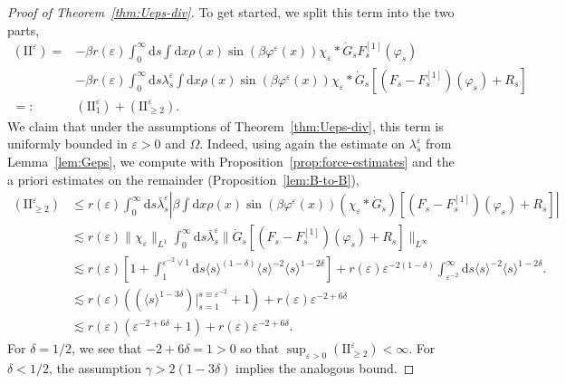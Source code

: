 \documentclass[11pt, a4paper]{scrartcl}
\numberwithin{equation}{section}
\theoremstyle{plain}
\theoremstyle{remark}
\newcommand{\Iota}{\mathrm{I}}
\newcommand{\backassign}{=:}
\newcommand{\mathd}{\mathrm{d}}
\newcommand{\tmtextbf}[1]{\text{{\bfseries{#1}}}}
\begin{document}
\begin{proof}[Proof of Theorem~\ref{thm:Ueps-div}]
  \tmtextbf{$(\Iota \Iota^{\varepsilon})$} To get started, we split this term
  into the two parts,
  \[ \begin{aligned}
       (\Iota \Iota^{\varepsilon}) =& - \beta r (\varepsilon)
       \int_0^{\infty} \mathd s \int \mathd x \rho (x) \sin (\beta
       \varphi^{\varepsilon} (x)) \chi_{\varepsilon} \ast \dot{G}_s F_s^{[1]}
       (\varphi_s)\\
       & - \beta r (\varepsilon) \int_0^{\infty} \mathd s
       \lambda_s^{\varepsilon} \int \mathd x \rho (x) \sin (\beta
       \varphi^{\varepsilon} (x)) \chi_{\varepsilon} \ast \dot{G}_s [(F_s  -
       F_s^{[1]}) (\varphi_s) + R_s]\\
       \backassign&  (\Iota \Iota^{\varepsilon}_1) + (\Iota
       \Iota_{\geqslant 2}^{\varepsilon}) .
     \end{aligned} \]
  \tmtextbf{$(\Iota \Iota^{\varepsilon}_{\geqslant 2})$} We claim that under
  the assumptions of Theorem~\ref{thm:Ueps-div}, this term is uniformly
  bounded in $\varepsilon > 0$ and $\Omega$. Indeed, using again the estimate
  on $\lambda^{\varepsilon}_s$ from Lemma~\ref{lem:Geps}, we compute with
  Proposition~\ref{prop:force-estimates} and the a priori estimates on the
  remainder (Proposition~\ref{lem:B-to-B}),
  \[ \begin{aligned}
       (\Iota \Iota_{\geqslant 2}^{\varepsilon}) &\leqslant  r (\varepsilon)
       \int_0^{\infty} \mathd s \bar{\lambda}_s^{\varepsilon} \left| \beta \int
       \mathd x \rho (x) \sin (\beta \varphi^{\varepsilon} (x))
       (\chi_{\varepsilon} \ast \dot{G}_s) [(F_s  - F_s^{[1]}) (\varphi_s) +
       R_s] \right|\\
       & \lesssim  r (\varepsilon) \| \chi_{\varepsilon} \|_{L^1}
       \int_0^{\infty} \mathd s \bar{\lambda}_s^{\varepsilon} \| \dot{G}_s [(F_s  -
       F_s^{[1]}) (\varphi_s) + R_s] \|_{L^{\infty}}\\
       & \lesssim  r (\varepsilon) \left[ 1 + \int_1^{\varepsilon^{- 2} \vee
       1} \mathd s \langle s \rangle^{(1 - \delta)} \langle s \rangle^{- 2}
       \langle s \rangle^{1 - 2 \delta} \right] + r (\varepsilon)
       \varepsilon^{- 2 (1 - \delta)} \int_{\varepsilon^{- 2}}^{\infty} \mathd
       s \langle s \rangle^{- 2} \langle s \rangle^{1 - 2 \delta} .\\
       & \lesssim  r (\varepsilon) ((\langle s \rangle^{1 - 3 \delta}) |_{s
       = 1}^{s \equiv \varepsilon^{- 2}} + 1) + r (\varepsilon) \varepsilon^{-
       2 + 6 \delta}\\
       & \lesssim  r (\varepsilon) (\varepsilon^{- 2 + 6 \delta} + 1) + r
       (\varepsilon) \varepsilon^{- 2 + 6 \delta}.
     \end{aligned} \]
  For $\delta = 1 / 2$, we see that $- 2 + 6 \delta = 1 > 0$ so that
  $\sup_{\varepsilon > 0} (\Iota \Iota^{\varepsilon}_{\geqslant 2}) < \infty$.
  For $\delta < 1 / 2$, the assumption $\gamma > 2 (1 - 3 \delta)$ implies the
  analogous bound.
  

\end{proof}
\end{document}
